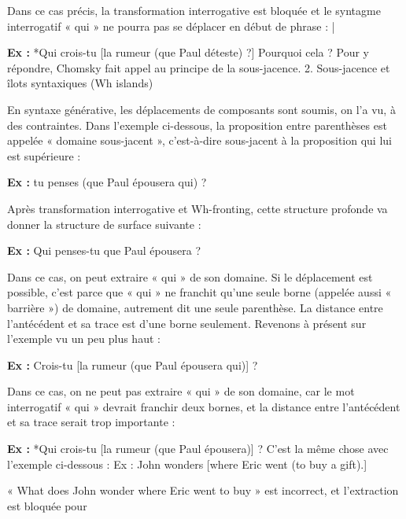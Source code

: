 Dans ce cas précis, la transformation interrogative est bloquée et le syntagme interrogatif « qui » ne pourra pas se déplacer en début de phrase : |\par

\noindent\textbf{Ex :} *Qui crois-tu [la rumeur (que Paul déteste) ?] Pourquoi cela ? Pour y répondre, Chomsky fait appel au principe de la sous-jacence. 2. Sous-jacence et îlots syntaxiques (Wh islands)\par

En syntaxe générative, les déplacements de composants sont soumis, on l’a vu, à des contraintes. Dans l’exemple ci-dessous, la proposition entre parenthèses est appelée « domaine sous-jacent », c’est-à-dire sous-jacent à la proposition qui lui est supérieure :\par

\noindent\textbf{Ex :} tu penses (que Paul épousera qui) ?\par

Après transformation interrogative et Wh-fronting, cette structure profonde va donner la structure de surface suivante :\par

\noindent\textbf{Ex :} Qui penses-tu que Paul épousera ?\par

Dans ce cas, on peut extraire « qui » de son domaine. Si le déplacement est possible, c’est parce que « qui » ne franchit qu’une seule borne (appelée aussi « barrière ») de domaine, autrement dit une seule parenthèse. La distance entre l’antécédent et sa trace est d’une borne seulement. Revenons à présent sur l’exemple vu un peu plus haut :\par

\noindent\textbf{Ex :} Crois-tu [la rumeur (que Paul épousera qui)] ?\par

Dans ce cas, on ne peut pas extraire « qui » de son domaine, car le mot interrogatif « qui » devrait franchir deux bornes, et la distance entre l’antécédent et sa trace serait trop importante :\par

\noindent\textbf{Ex :} *Qui crois-tu [la rumeur (que Paul épousera)] ? C’est la même chose avec l’exemple ci-dessous : Ex : John wonders [where Eric went (to buy a gift).]\par

« What does John wonder where Eric went to buy » est incorrect, et l'extraction est bloquée pour\par

